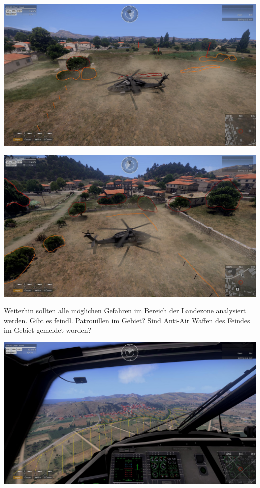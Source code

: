 	\begin{minipage}[t]{1\textwidth}
		\includegraphics[width=\textwidth]{./Grafiken/Hubschrauber/BodenLesenausSichtdesPiloten1.jpg}
	\end{minipage}

	\begin{minipage}[t]{1\textwidth}
		\includegraphics[width=\textwidth]{./Grafiken/Hubschrauber/BodenLesenausSichtdesPiloten2.jpg}
	\end{minipage}	

	Weiterhin sollten alle möglichen Gefahren im Bereich der Landezone analysiert werden. Gibt es feindl. Patrouillen im Gebiet? Sind Anti-Air Waffen des Feindes im Gebiet gemeldet worden? \\

	\begin{minipage}[t]{1\textwidth}
		\includegraphics[width=\textwidth]{./Grafiken/Hubschrauber/AusSichtdesPiloten.jpg}
	\end{minipage}	
			
